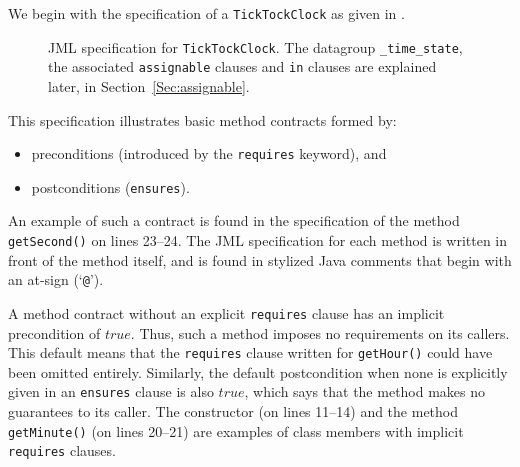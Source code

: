 \documentclass{llncs}
\begin{document}
%
We begin with the specification of a \texttt{TickTockClock} as given in
.
\begin{figure}[tbp]
%
%
\vspace*{-2ex} %
\caption{JML specification for \texttt{TickTockClock}.
  The datagroup \texttt{\_time\_state}, the
  associated \texttt{assignable} clauses and \texttt{in} clauses are
  explained later, in Section~\ref{Sec:assignable}.} 
\label{Example:TickTockClock}
\end{figure}
This specification illustrates basic
method contracts formed by:
%
\begin{itemize}
  \item preconditions (introduced by the \texttt{requires} keyword), and
  \item postconditions (\texttt{ensures}).
\end{itemize}
An example of such a contract is found in the specification of the
method \texttt{getSecond()} on lines 23--24.  The JML specification for
each method is written in front of the method itself, and is found in
stylized Java comments 
that begin with an at-sign (`\texttt{@}').

%

% 
%
A method contract without an explicit \texttt{requires} clause has
an implicit precondition of $true$.  Thus, such a
method imposes no requirements on its callers.  This default means
that the \texttt{requires} clause written for \texttt{getHour()} could
have been omitted entirely.
Similarly, the default postcondition 
when none is explicitly given in an \texttt{ensures} clause is also
$true$, which says that the method makes no guarantees to
its caller.
The constructor (on lines 11--14)
and the method \texttt{getMinute()} (on lines 20--21) are
examples of class members with implicit \texttt{requires} clauses.
\end{document}
